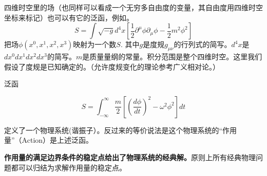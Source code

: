 \documentclass[CJK]{beamer}
\begin{document}
\begin{frame}
\bch
四维时空里的场（也同样可以看成一个无穷多自由度的变量，其自由度用四维时空坐标来标记）也可以有它的泛函，例如。
\ech
\bex
$$ S = \int \sqrt{-g} d^4x \left[\frac{1}{2}\partial^\mu\phi \partial_\mu\phi - \frac{1}{2}m^2\phi^2\right]$$
\bch
把场$\phi(x^0,x^1, x^2, x^3)$映射为一个数$S$. 其中$g$是度规$g_{\mu\nu}$的行列式的简写。$d^4x$是$dx^0dx^1dx^2dx^3$的简写。$m$是质量量纲的常量。积分范围是整个四维时空。这里我们假设了度规是已知确定的。（允许度规变化的理论参考广义相对论。）
\ech
\eex
\end{frame}

\begin{frame}
\bch
泛函

$$ S = \int_{-\infty}^\infty \frac{m}{2}\left[(\frac{d\phi}{dt})^2 - \omega^2\phi^2\right] dt$$

定义了一个物理系统(谐振子）。反过来的等价说法是这个物理系统的“作用量”（Action）是上述泛函。

\skipline
{\bf 作用量的满足边界条件的稳定点给出了物理系统的经典解。}原则上所有经典物理问题都可以归结为求解作用量的稳定点。
\ech

\end{frame}


\begin{frame}

\end{frame}
\end{document}
